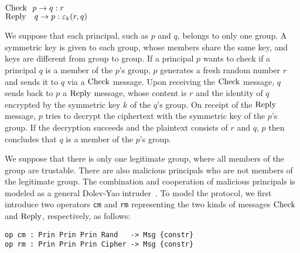 \documentclass[a4paper,fleqn]{cas-dc}
\begin{document}
\smallskip
\noindent
${\rm Check} \ \  p \rightarrow q : r$\\
${\rm Reply}  \ \ \ q \rightarrow p : \varepsilon_k(r,q)$

\smallskip
\noindent
We suppose that each principal, such as $p$ and $q$, belongs to only one group. A symmetric key is given to each group, whose members share the same key, and keys are different from group to group. If a principal $p$ wants to check if a principal $q$ is a member of the $p$'s group, $p$ generates a fresh random number $r$ and sends it to $q$ via a $\rm Check$ message. 
Upon receiving the $\rm Check$ message, $q$ sends back to $p$ a $\rm Reply$ message, whose content is $r$ and the identity of $q$ encrypted by the symmetric key $k$ of the $q$'s group. On receipt of the $\rm Reply$ message, $p$ tries to decrypt the ciphertext with the symmetric key of the $p$'s group. If the decryption succeeds and the plaintext consists of $r$ and $q$, $p$ then concludes that $q$ is a member of the $p$'s group. 

We suppose that there is only one legitimate group, where all members of the group are trustable.
There are also malicious principals who are not members of the legitimate group.
The combination and cooperation of malicious principals is modeled as a general Dolev-Yao intruder~\cite{DolevY83}. To model the protocol, we first introduce two operators \verb!cm! and \verb!rm! representing the two kinds of messages $\rm Check$ and $\rm Reply$, respectively, as follows:

\begin{small}
\begin{verbatim}
op cm : Prin Prin Prin Rand   -> Msg {constr}
op rm : Prin Prin Prin Cipher -> Msg {constr}
\end{verbatim}
\end{small}
\end{document}
